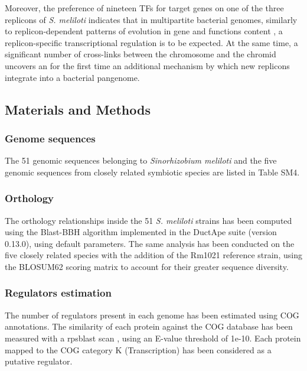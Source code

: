 Moreover, the preference of nineteen TFs for target genes on one of the three replicons of \textit{S. meliloti} indicates that in multipartite bacterial genomes, similarly to replicon-dependent patterns of evolution in gene and functions content \cite{galardini2013replicon}, a replicon-specific transcriptional regulation is to be expected. At the same time, a significant number of cross-links between the chromosome and the chromid uncovers an for the first time an additional mechanism by which new replicons integrate into a bacterial pangenome.

\subsection{Materials and Methods \label{sec:mat}}

\subsubsection{Genome sequences}
The 51 genomic sequences belonging to \textit{Sinorhizobium meliloti} and the five genomic sequences from closely related symbiotic species are listed in Table SM4.

\subsubsection{Orthology}
The orthology relationships inside the 51 \textit{S. meliloti} strains has been computed using the Blast-BBH algorithm implemented in the DuctApe suite (version 0.13.0)\cite{galardini2014ductape}, using default parameters. The same analysis has been conducted on the five closely related species with the addition of the Rm1021 reference strain, using the BLOSUM62 scoring matrix to account for their greater sequence diversity.

\subsubsection{Regulators estimation}
The number of regulators present in each genome has been estimated using COG annotations. The similarity of each protein against the COG database has been measured with a rpsblast scan \cite{altschul1990basic}, using an E-value threshold of 1e-10. Each protein mapped to the COG category K (Transcription) has been considered as a putative regulator.

